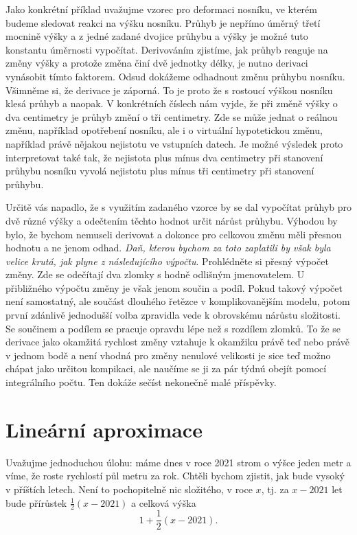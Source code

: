 \documentclass[12pt]{article}
\begin{document}
Jako konkrétní příklad uvažujme vzorec pro deformaci nosníku, ve kterém budeme sledovat reakci na výšku nosníku. Průhyb je nepřímo úměrný třetí mocnině výšky a z jedné zadané dvojice průhybu a výšky je možné tuto konstantu úměrnosti vypočítat. Derivováním zjistíme, jak průhyb reaguje na změny výšky a protože změna činí dvě jednotky délky, je nutno derivaci vynásobit tímto faktorem. Odsud dokážeme odhadnout změnu průhybu nosníku. Všimněme si, že derivace je záporná. To je proto že s rostoucí výškou nosníku klesá průhyb a naopak. V konkrétních číslech nám vyjde, že při změně výšky o dva centimetry je průhyb změní o tři centimetry. Zde se může jednat o reálnou změnu, například opotřebení nosníku, ale i o virtuální hypotetickou změnu, například právě nějakou nejistotu ve vstupních datech. Je možné výsledek proto interpretovat také tak, že nejistota plus mínus dva centimetry při stanovení průhybu nosníku vyvolá nejistotu plus mínus tři centimetry při stanovení průhybu.

Určitě vás napadlo, že s využitím zadaného vzorce by se dal vypočítat průhyb pro dvě různé výšky a odečtením těchto hodnot určit nárůst průhybu. Výhodou by bylo, že bychom nemuseli derivovat a dokonce pro celkovou změnu měli přesnou hodnotu a ne jenom odhad. \textit{Daň, kterou bychom za toto zaplatili by však byla velice krutá, jak plyne z následujícího výpočtu}. Prohlédněte si přesný výpočet změny. Zde se odečítají dva zlomky s hodně odlišným jmenovatelem. U přibližného výpočtu změny je však jenom součin a podíl. Pokud takový výpočet není samostatný, ale součást dlouhého řetězce v komplikovanějším modelu, potom první zdánlivě jednodušší volba zpravidla vede k obrovskému nárůstu složitosti. Se součinem a podílem se pracuje opravdu lépe než s rozdílem zlomků. To že se derivace jako okamžitá rychlost změny vztahuje k okamžiku právě teď nebo právě v jednom bodě a není vhodná pro změny nenulové velikosti je sice teď možno chápat jako určitou kompikaci, ale naučíme se ji za pár týdnú obejít pomocí integrálního počtu. Ten dokáže sečíst nekonečně malé příspěvky.

\section*{Lineární aproximace}

Uvažujme jednoduchou úlohu: máme dnes v roce 2021 strom o výšce jeden metr a víme, že roste rychlostí půl metru za rok. Chtěli bychom zjistit, jak bude vysoký v příštích letech. Není to pochopitelně nic složitého, v roce $x$, tj. za $x-2021$ let bude přírůstek $\frac 12 (x-2021)$ a celková výška $$1+\frac 12 (x-2021).$$
\end{document}
